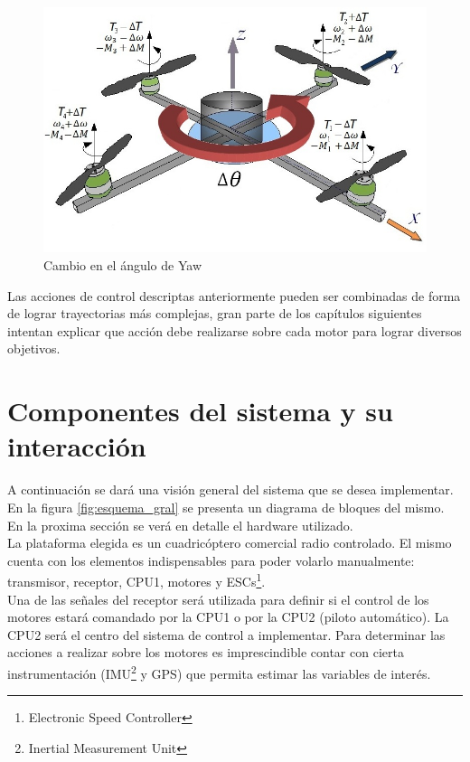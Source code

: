 \documentclass[main]{subfiles}
\begin{document}
\begin{figure}[!h]
\centering
\includegraphics[scale=0.4]{./pics_general/quad_theta.jpg}
\caption{Cambio en el \'angulo de Yaw}
\label{fig:quad_theta}
\end{figure}
Las acciones de control descriptas anteriormente pueden ser combinadas de forma de lograr trayectorias m\'as complejas, gran parte de los cap\'itulos siguientes intentan explicar que acci\'on debe realizarse sobre cada motor para lograr diversos objetivos.

\section{Componentes del sistema y su interacci\'on}

A continuaci\'on se dar\'a una visi\'on general del sistema que se desea implementar. En la figura \ref{fig:esquema_gral} se presenta un diagrama de bloques del mismo. En la proxima secci\'on se ver\'a en detalle el hardware utilizado.\\

La plataforma elegida es un cuadric\'optero comercial radio controlado. El mismo cuenta con los elementos indispensables para poder volarlo manualmente: transmisor, receptor, CPU1, motores y ESCs\footnote{Electronic Speed Controller}.\\   

Una de las señales del receptor ser\'a utilizada para definir si el control de los motores estar\'a comandado por la CPU1 o por la CPU2 (piloto autom\'atico). La CPU2 ser\'a el centro del sistema de control a implementar. Para determinar las acciones a realizar sobre los motores es imprescindible contar con cierta instrumentaci\'on (IMU\footnote{Inertial Measurement Unit} y GPS) que permita estimar las variables de inter\'es.\\
\end{document}
